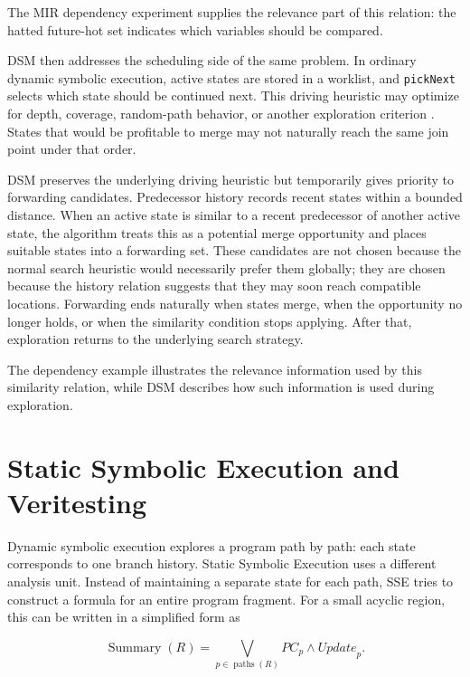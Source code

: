 \documentclass[conference]{IEEEtran}
\begin{document}
The MIR dependency experiment supplies the relevance part of this relation:
the hatted future-hot set indicates which variables should be compared.

DSM then addresses the scheduling side of the same problem. In ordinary dynamic
symbolic execution, active states are stored in a worklist, and
\texttt{pickNext} selects which state should be continued next. This driving
heuristic may optimize for depth, coverage, random-path behavior, or another
exploration criterion \cite{efficient-merging}. States that would be profitable
to merge may not naturally reach the same join point under that order.

DSM preserves the underlying driving heuristic but temporarily gives priority
to forwarding candidates. Predecessor history records recent states within a
bounded distance. When an active state is similar to a recent predecessor of
another active state, the algorithm treats this as a potential merge
opportunity and places suitable states into a forwarding set. These candidates
are not chosen because the normal search heuristic would necessarily prefer
them globally; they are chosen because the history relation suggests that they
may soon reach compatible locations. Forwarding ends naturally when states
merge, when the opportunity no longer holds, or when the similarity condition
stops applying. After that, exploration returns to the underlying search
strategy.

The dependency example illustrates the relevance information used by this
similarity relation, while DSM describes how such information is used during
exploration.

\section{Static Symbolic Execution and Veritesting}
\label{sec:veritesting}

Dynamic symbolic execution explores a program path by path: each state
corresponds to one branch history. Static Symbolic Execution uses a different
analysis unit. Instead of maintaining a separate state for each path, SSE tries
to construct a formula for an entire program fragment. For a small acyclic
region, this can be written in a simplified form as

\begin{equation}
\label{eq:sse-summary}
\operatorname{Summary}(R) =
\bigvee_{p \in \operatorname{paths}(R)}
PC_p \land \mathit{Update}_p.
\end{equation}
\end{document}
